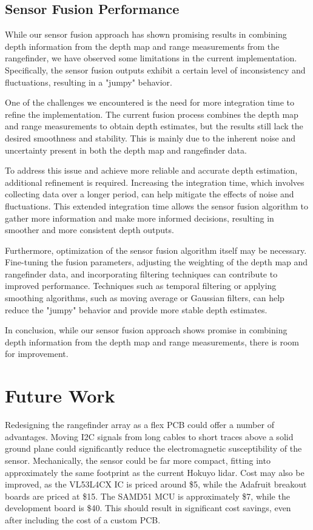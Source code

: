 \documentclass[conference]{IEEEtran}
\begin{document}
\subsection{Sensor Fusion Performance}
While our sensor fusion approach has shown promising results in combining depth information from the depth map and range measurements from the rangefinder, we have observed some limitations in the current implementation. Specifically, the sensor fusion outputs exhibit a certain level of inconsistency and fluctuations, resulting in a "jumpy" behavior.

One of the challenges we encountered is the need for more integration time to refine the implementation. The current fusion process combines the depth map and range measurements to obtain depth estimates, but the results still lack the desired smoothness and stability. This is mainly due to the inherent noise and uncertainty present in both the depth map and rangefinder data.

To address this issue and achieve more reliable and accurate depth estimation, additional refinement is required. Increasing the integration time, which involves collecting data over a longer period, can help mitigate the effects of noise and fluctuations. This extended integration time allows the sensor fusion algorithm to gather more information and make more informed decisions, resulting in smoother and more consistent depth outputs.

Furthermore, optimization of the sensor fusion algorithm itself may be necessary. Fine-tuning the fusion parameters, adjusting the weighting of the depth map and rangefinder data, and incorporating filtering techniques can contribute to improved performance. Techniques such as temporal filtering or applying smoothing algorithms, such as moving average or Gaussian filters, can help reduce the "jumpy" behavior and provide more stable depth estimates.

In conclusion, while our sensor fusion approach shows promise in combining depth information from the depth map and range measurements, there is room for improvement. 

\section{Future Work}
Redesigning the rangefinder array as a flex PCB could offer a number of
advantages. Moving I2C signals from long cables to short traces above a solid
ground plane could significantly reduce the electromagnetic susceptibility of
the sensor. Mechanically, the sensor could be far more compact, fitting into
approximately the same footprint as the current Hokuyo lidar. Cost may also be
improved, as the VL53L4CX IC is priced around \$5, while the Adafruit breakout
boards are priced at \$15. The SAMD51 MCU is approximately \$7, while the
development board is \$40. This should result in significant cost savings, even
after including the cost of a custom PCB.
\end{document}
